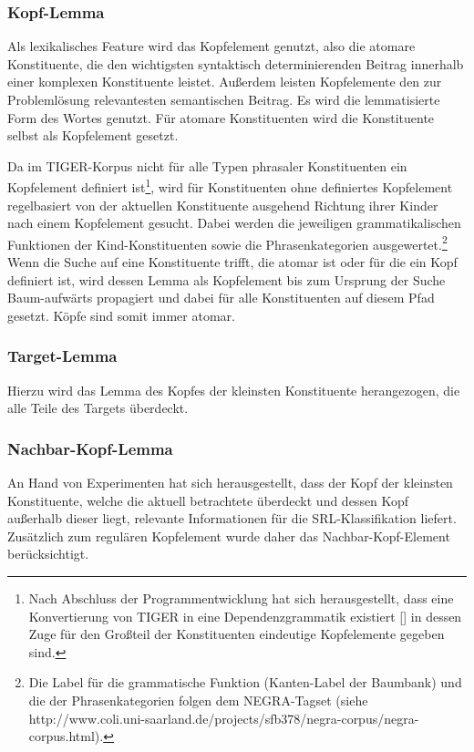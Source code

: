 \documentclass[12pt]{article}
\begin{document}
\subsubsection*{Kopf-Lemma}
Als lexikalisches Feature wird das Kopfelement genutzt, also die atomare Konstituente, die den wichtigsten syntaktisch determinierenden Beitrag innerhalb einer komplexen Konstituente leistet. Außerdem leisten Kopfelemente den zur Problemlösung relevantesten semantischen Beitrag. Es wird die lemmatisierte Form des Wortes genutzt. Für atomare Konstituenten
wird die Konstituente selbst als Kopfelement gesetzt.

Da im TIGER-Korpus nicht für alle Typen phrasaler Konstituenten ein Kopfelement definiert ist\footnote{Nach Abschluss der Programmentwicklung hat sich herausgestellt, dass eine Konvertierung von TIGER in eine Dependenzgrammatik existiert [\cite{kountz_extraktion_2006}] in dessen Zuge für den Großteil der Konstituenten eindeutige Kopfelemente gegeben sind.}, wird für Konstituenten ohne definiertes Kopfelement regelbasiert von der aktuellen Konstituente ausgehend Richtung ihrer Kinder nach einem Kopfelement gesucht. Dabei werden die jeweiligen grammatikalischen Funktionen der Kind-Konstituenten sowie die Phrasenkategorien ausgewertet.\footnote{Die Label für die grammatische Funktion (Kanten-Label der Baumbank) und die der Phrasenkategorien folgen dem NEGRA-Tagset (siehe http://www.coli.uni-saarland.de/projects/sfb378/negra-corpus/negra-corpus.html).} Wenn die Suche auf eine Konstituente trifft, die atomar ist oder für die ein Kopf definiert ist, wird dessen Lemma als Kopfelement bis zum Ursprung der Suche Baum-aufwärts propagiert und dabei für alle Konstituenten auf diesem Pfad gesetzt. Köpfe sind somit immer atomar.
\subsubsection*{Target-Lemma}
Hierzu wird das Lemma des Kopfes der kleinsten Konstituente herangezogen, die alle Teile des Targets überdeckt.
\subsubsection*{Nachbar-Kopf-Lemma}
An Hand von Experimenten hat sich herausgestellt, dass der Kopf der kleinsten Konstituente, welche die aktuell betrachtete überdeckt und dessen Kopf außerhalb dieser liegt, relevante Informationen für die SRL-Klassifikation liefert. Zusätzlich zum regulären Kopfelement wurde daher das Nachbar-Kopf-Element berücksichtigt.  
\end{document}
